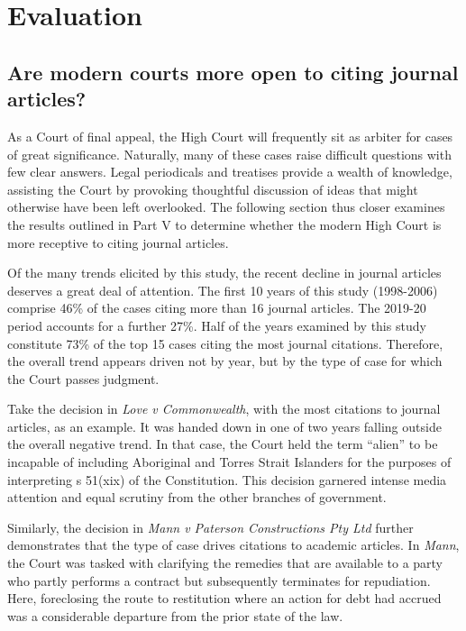\let\xn\xnote
\section{Evaluation}

\subsection{Are modern courts more open to citing journal articles?}

As a Court of final appeal, the High Court will frequently sit as arbiter for cases of great significance.\xn{6-1} Naturally, many of these cases raise difficult questions with few clear answers.\xn{6-2} Legal periodicals and treatises provide a wealth of knowledge, assisting the Court by provoking thoughtful discussion of ideas that might otherwise have been left overlooked. The following section thus closer examines the results outlined in Part V to determine whether the modern High Court is more receptive to citing journal articles.

Of the many trends elicited by this study, the recent decline in journal articles deserves a great deal of attention. The first 10 years of this study (1998-2006) comprise 46\% of the cases citing more than 16 journal articles. The 2019-20 period accounts for a further 27\%. Half of the years examined by this study constitute 73\% of the top 15 cases citing the most journal citations. Therefore, the overall trend appears driven not by year, but by the type of case for which the Court passes judgment.

Take the decision in \emph{Love v Commonwealth}, with the most citations to journal articles, as an example.\xn{6-3} It was handed down in one of two years falling outside the overall negative trend. In that case, the Court held the term ``alien'' to be incapable of including Aboriginal and Torres Strait Islanders for the purposes of interpreting s 51(xix) of the Constitution.\xn{6-4} This decision garnered intense media attention and equal scrutiny from the other branches of government.\xn{6-5} 

Similarly, the decision in \emph{Mann v Paterson Constructions Pty Ltd} further demonstrates that the type of case drives citations to academic articles.\xn{6-6} In \textit{Mann}, the Court was tasked with clarifying the remedies that are available to a party who partly performs a contract but subsequently terminates for repudiation.\xn{6-7} Here, foreclosing the route to restitution where an action for debt had accrued was a considerable departure from the prior state of the law.\xn{6-8} 

